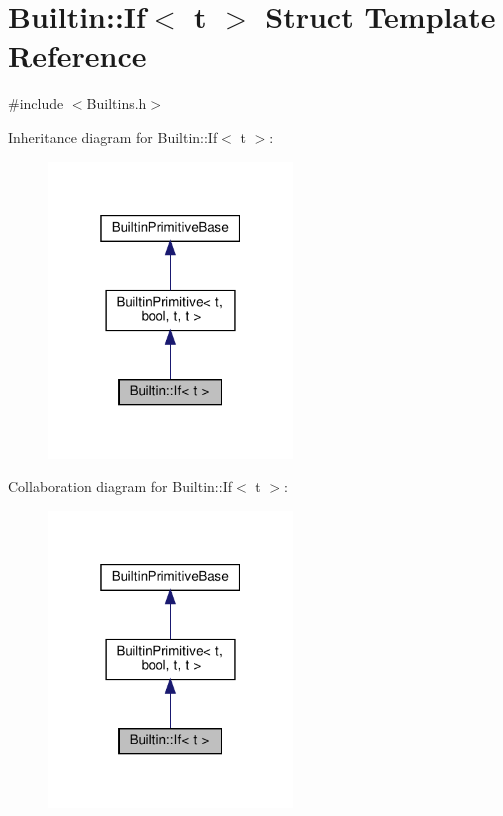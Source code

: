 \hypertarget{struct_builtin_1_1_if}{}\section{Builtin\+:\+:If$<$ t $>$ Struct Template Reference}
\label{struct_builtin_1_1_if}


{\ttfamily \#include $<$Builtins.\+h$>$}



Inheritance diagram for Builtin\+:\+:If$<$ t $>$\+:
\nopagebreak
\begin{figure}[H]
\begin{center}
\leavevmode
\includegraphics[width=184pt]{struct_builtin_1_1_if__inherit__graph}
\end{center}
\end{figure}


Collaboration diagram for Builtin\+:\+:If$<$ t $>$\+:
\nopagebreak
\begin{figure}[H]
\begin{center}
\leavevmode
\includegraphics[width=184pt]{struct_builtin_1_1_if__coll__graph}
\end{center}
\end{figure}
